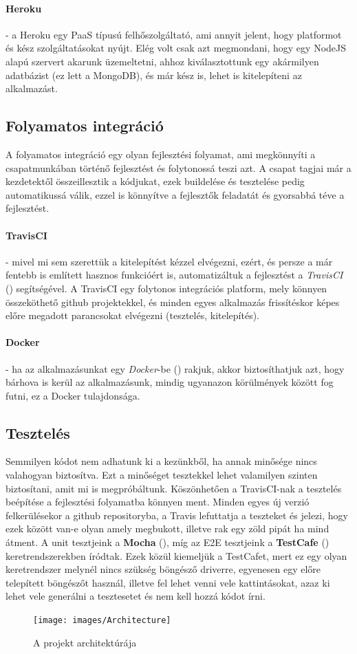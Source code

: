 \paragraph{Heroku} - a Heroku egy PaaS típusú felhőszolgáltató, ami annyit jelent, hogy platformot és kész szolgáltatásokat nyújt. Elég volt csak azt megmondani, hogy egy NodeJS alapú szervert akarunk üzemeltetni, ahhoz kiválasztottunk egy akármilyen adatbázist (ez lett a MongoDB), és már kész is, lehet is kitelepíteni az alkalmazást.

\subsection{Folyamatos integráció}

A folyamatos integráció egy olyan fejlesztési folyamat, ami megkönnyíti a csapatmunkában történő fejlesztést és folytonossá teszi azt. A csapat tagjai már a kezdetektől összeillesztik a kódjukat, ezek buildelése és tesztelése pedig automatikussá válik, ezzel is könnyítve a fejlesztők feladatát és gyorsabbá téve a fejlesztést.

\paragraph{TravisCI} - mivel mi sem szerettük a kitelepítést kézzel elvégezni, ezért, és persze a már fentebb is említett hasznos funkcióért is, automatizáltuk a fejlesztést a \textit{TravisCI} (\cite{soft:travis}) segítségével. A TravisCI egy folytonos integrációs platform, mely könnyen összeköthető github projektekkel, és minden egyes alkalmazás frissítéskor képes előre megadott parancsokat elvégezni (tesztelés, kitelepítés).

\paragraph{Docker} - ha az alkalmazásunkat egy \textit{Docker}-be (\cite{soft:docker}) rakjuk, akkor biztosíthatjuk azt, hogy bárhova is kerül az alkalmazásunk, mindig ugyanazon körülmények között fog futni, ez a Docker tulajdonsága.

\subsection{Tesztelés}

Semmilyen kódot nem adhatunk ki a kezünkből, ha annak minősége nincs valahogyan biztosítva. Ezt a minőséget tesztekkel lehet valamilyen szinten biztosítani, amit mi is megpróbáltunk. Köszönhetően a TravisCI-nak a tesztelés beépítése a fejlesztési folyamatba könnyen ment. Minden egyes új verzió felkerülésekor a github repositoryba, a Travis lefuttatja a teszteket és jelezi, hogy ezek között van-e olyan amely megbukott, illetve rak egy zöld pipát ha mind átment. A unit tesztjeink a \textbf{Mocha} (\cite{soft:mocha}), míg az E2E tesztjeink a \textbf{TestCafe} (\cite{soft:testcafe}) keretrendszerekben íródtak. Ezek közül kiemeljük a TestCafet, mert ez egy olyan keretrendszer melynél nincs szükség böngésző driverre, egyenesen egy előre telepített böngészőt használ, illetve fel lehet venni vele kattintásokat, azaz ki lehet vele generálni a tesztesetet és nem kell hozzá kódot írni.

\begin{figure}[ht!]
	\centering
	\texttt{[image: images/Architecture]}
	\caption{A projekt architektúrája}
	\label{fig:Architecture}
\end{figure}
